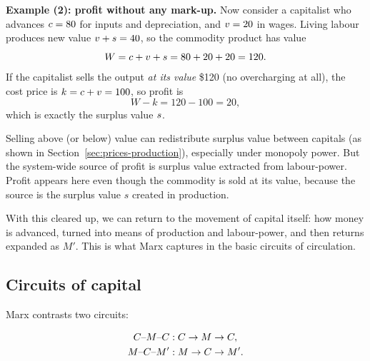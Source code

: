 \medskip

\textbf{Example (2): profit without any mark-up.}
Now consider a capitalist who advances $c=80$ for inputs and depreciation, and $v=20$ in wages.
Living labour produces new value $v+s = 40$, so the commodity product has value
\[
  W = c + v + s = 80 + 20 + 20 = 120.
\]
If the capitalist sells the output \emph{at its value} \$120 (no overcharging at all), the cost price is
$k=c+v=100$, so profit is
\[
  W-k = 120-100=20,
\]
which is exactly the surplus value $s$.

\medskip

\noindent
Selling above (or below) value can redistribute surplus value between capitals (as shown in
Section~\ref{sec:prices-production}), especially under monopoly power. But the system-wide source of
profit is surplus value extracted from labour-power. Profit appears here even though the commodity is
sold at its value, because the source is the surplus value $s$ created in production.

\medskip
With this cleared up, we can return to the movement of capital itself: how money is advanced, turned into means of production and labour-power, and then returns expanded as $M'$. This is what Marx captures in the basic circuits of circulation.
\medskip


\subsection{Circuits of capital}
\label{subsec:circuits}

Marx contrasts two circuits:

\begin{align}
  C \text{--} M \text{--} C &: C \rightarrow M \rightarrow C,
  \label{eq:cmc}\\
  M \text{--} C \text{--} M' &: M \rightarrow C \rightarrow M'.
  \label{eq:mcm}
\end{align}

